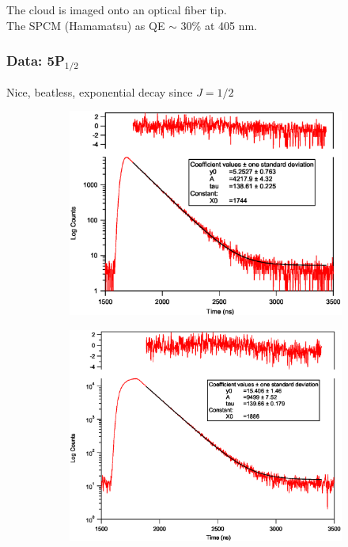 \documentclass{beamer}
\theoremstyle{definition}
\begin{document}
\begin{frame}
The cloud is imaged onto an optical fiber tip. \\
The SPCM (Hamamatsu) as QE $\sim$ 30\% at 405 nm.





\end{frame}






\begin{frame}
\frametitle{Data: 5P$_{\text{1/2}}$}


Nice, beatless, exponential decay since $J=1/2$





\begin{figure}[!htb]
	\centering
	\hspace{10 pt}
	\begin{subfigure}{0.49\textwidth}
		\includegraphics[width=\textwidth]{p12_70ns_pol.eps}
	\end{subfigure}
	\hspace{-20 pt}
	\begin{subfigure}{0.49\textwidth}
		\includegraphics[width=\textwidth]{p12_200ns_nopolar.eps}
	\end{subfigure}
\end{figure}



\end{frame}
\end{document}
